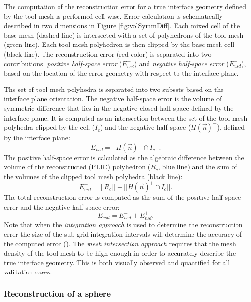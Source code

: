 The computation of the reconstruction error for a true interface geometry
defined by the tool mesh is performed cell-wise. Error calculation is
schematically described in two dimensions in Figure \ref{fig:volSymmDiff}. Each
mixed cell of the base mesh (dashed line) is intersected with a set of
polyhedrons of the tool mesh (green line). Each tool mesh polyhedron is then
clipped by the base mesh cell (black line). The reconstruction error (red
color) is separated into two contributions: \emph{positive half-space error}
($E_{vsd}^+$) and \emph{negative half-space error} ($E_{vsd}^-$), based on the
location of the error geometry with respect to the interface plane.

The set of tool mesh polyhedra is separated into two subsets based on the
interface plane orientation. The negative half-space error is the volume of
symmetric difference that lies in the negative closed half-space defined by the
interface plane. It is computed as an intersection between the set of the tool
mesh polyhedra clipped by the cell ($I_c$) and the negative half-space
($H(\vec{n})^-$), defined by the interface plane:
%
\begin{equation}
        E_{vsd}^{-} = || H(\vec{n})^- \cap I_{c} ||. 
\end{equation}
%
The positive half-space error is calculated as the algebraic difference between
the volume of the reconstructed (PLIC) polyhedron ($R_c$, blue line) and the
sum of the volumes of the clipped tool mesh polyhedra (black line): 
%
\begin{equation}
        E_{vsd}^+ = || R_c || - ||H(\vec{n})^+ \cap I_c||. 
\end{equation}
%
The total reconstruction error is computed as the sum of the positive
half-space error and the negative half-space error: 
%
\begin{equation}
        E_{vsd} = E_{vsd}^- + E_{vsd}^+.
\end{equation}
%
Note that when the \emph{integration approach} is used to determine the
reconstruction error the size of the sub-grid integration intervals will
determine the accuracy of the computed error (\cite{Aulisa2007}). The
\emph{mesh intersection approach} requires that the mesh density of the tool
mesh to be high enough in order to accurately describe the true interface
geometry. This is both visually observed and quantified for all validation
cases.   

\subsubsection{Reconstruction of a sphere} 

